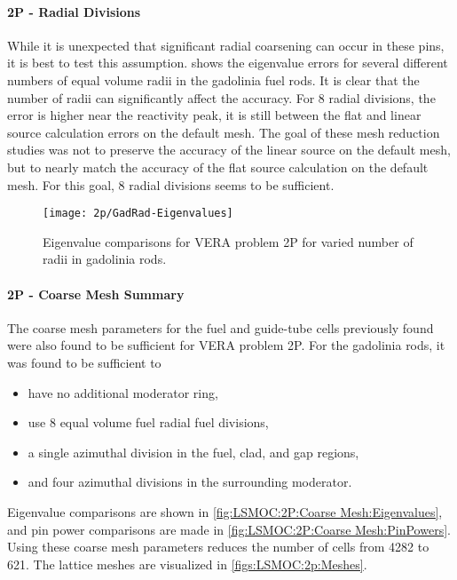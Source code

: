 {{{{        \paragraph{2P - Radial Divisions}{
          While it is unexpected that significant radial coarsening can occur in these pins, it is best to test this assumption.
           shows the eigenvalue errors for several different numbers of equal volume radii in the gadolinia fuel rods.
          It is clear that the number of radii can significantly affect the accuracy.
          For 8 radial divisions, the error is higher near the reactivity peak, it is still between the flat and linear source calculation errors on the default mesh.
          The goal of these mesh reduction studies was not to preserve the accuracy of the linear source on the default mesh, but to nearly match the accuracy of the flat source calculation on the default mesh.
          For this goal, 8 radial divisions seems to be sufficient.

          \begin{figure}
              \centering
              \texttt{[image: 2p/GadRad-Eigenvalues]}
              \caption{Eigenvalue comparisons for VERA problem 2P for varied number of radii in gadolinia rods.\label{fig:LSMOC:2P:Gad Rad:Eigenvalues}}
          \end{figure}
        }
        \paragraph{2P - Coarse Mesh Summary}{
          The coarse mesh parameters for the fuel and guide-tube cells previously found were also found to be sufficient for \ac{VERA} problem 2P.
          For the gadolinia rods, it was found to be sufficient to
          \begin{itemize}
            \item{have no additional moderator ring,}
            \item{use 8 equal volume fuel radial fuel divisions,}
            \item{a single azimuthal division in the fuel, clad, and gap regions,}
            \item{and four azimuthal divisions in the surrounding moderator.}
          \end{itemize}

          Eigenvalue comparisons are shown in \cref{fig:LSMOC:2P:Coarse Mesh:Eigenvalues}, and pin power comparisons are made in \cref{fig:LSMOC:2P:Coarse Mesh:PinPowers}.
          Using these coarse mesh parameters reduces the number of cells from 4282 to 621.
          The lattice meshes are visualized in \cref{figs:LSMOC:2p:Meshes}.

}}}}}
